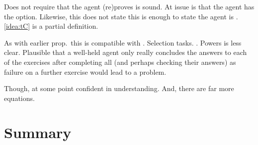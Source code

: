 \begin{note}
  Does not require that the agent (re)proves \sqE{} is sound.
  At issue is that the agent has the option.
  Likewise, this does not state this is enough to state the agent is \tCV{}.
  \autoref{idea:tC} is a partial definition.
\end{note}


\begin{note}
  As with earlier prop.\ this is compatible with \issueConstraint{}.
  Selection tasks.
  \sqE{}.
  Powers is less clear.
  Plausible that a well-held agent only really concludes the answers to each of the exercises after completing all (and perhaps checking their answers) as failure on a further exercise would lead to a problem.

  Though, at some point confident in understanding.
  And, there are far more equations.
\end{note}





\section*{Summary}











